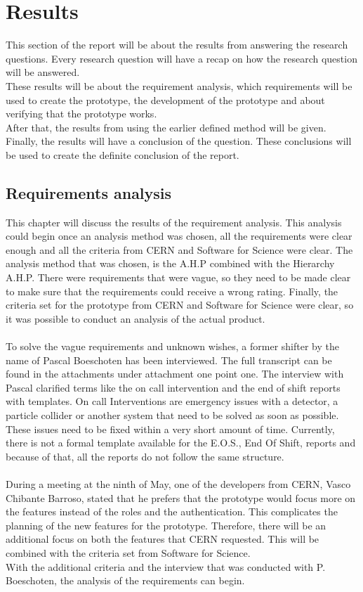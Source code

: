 \documentclass[paper=a4, fontsize=11pt,twoside]{scrartcl}	%
\begin{document}
\section{Results}
This section of the report will be about the results from answering the research questions. Every research question will have a recap on how the research question will be answered. \\
These results will be about the requirement analysis, which requirements will be used to create the prototype, the development of the prototype and about verifying that the prototype works. \\
After that, the results from using the earlier defined method will be given. Finally, the results will have a conclusion of the question. These conclusions will be used to create the definite conclusion of the report.
\newpage
\subsection{Requirements analysis}
This chapter will discuss the results of the requirement analysis. This analysis could begin once an analysis method was chosen, all the requirements were clear enough and all the criteria from CERN and Software for Science were clear. The analysis method that was chosen, is the A.H.P combined with the Hierarchy A.H.P. There were requirements that were vague, so they need to be made clear to make sure that the requirements could receive a wrong rating. Finally, the criteria set for the prototype from CERN and Software for Science were clear, so it was possible to conduct an analysis of the actual product. \\ \\
To solve the vague requirements and unknown wishes, a former shifter by the name of Pascal Boeschoten has been interviewed. The full transcript can be found in the attachments under attachment one point one. The interview with Pascal clarified  terms like the on call intervention and the end of shift reports with templates. On call Interventions are emergency issues with a detector, a particle collider or another system that need to be solved as soon as possible. These issues need to be fixed within a very short amount of time. Currently, there is not a formal template available for the E.O.S., End Of Shift, reports  and because of that, all the reports do not follow the same structure.\\ \\
During a meeting at the ninth of May, one of the developers from CERN, Vasco Chibante Barroso, stated that he prefers that the prototype would focus more on the features instead of the roles and the authentication. This complicates the planning of the new features for the prototype. Therefore, there will be an additional focus on both the features that CERN requested. This will be combined with the criteria set from Software for Science. \\ 
With the additional criteria and the interview that was conducted with P. Boeschoten, the analysis of the requirements can begin. \\ \\
\end{document}
